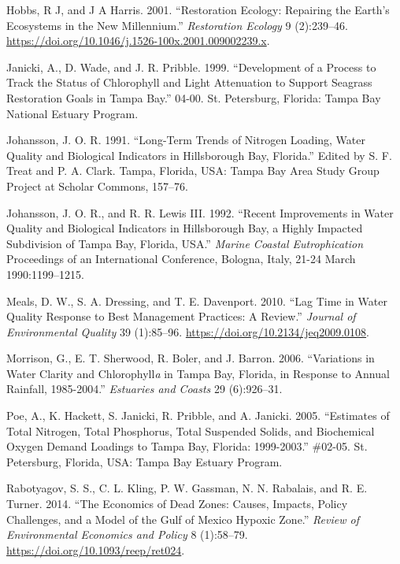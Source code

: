 \documentclass[]{article}
\begin{document}
\leavevmode\hypertarget{ref-Hobbs01}{}%
Hobbs, R J, and J A Harris. 2001. ``Restoration Ecology: Repairing the
Earth's Ecosystems in the New Millennium.'' \emph{Restoration Ecology} 9
(2):239--46. \url{https://doi.org/10.1046/j.1526-100x.2001.009002239.x}.

\leavevmode\hypertarget{ref-Janicki99}{}%
Janicki, A., D. Wade, and J. R. Pribble. 1999. ``Development of a
Process to Track the Status of Chlorophyll and Light Attenuation to
Support Seagrass Restoration Goals in Tampa Bay.'' 04-00. St.
Petersburg, Florida: Tampa Bay National Estuary Program.

\leavevmode\hypertarget{ref-Johansson91}{}%
Johansson, J. O. R. 1991. ``Long-Term Trends of Nitrogen Loading, Water
Quality and Biological Indicators in Hillsborough Bay, Florida.'' Edited
by S. F. Treat and P. A. Clark. Tampa, Florida, USA: Tampa Bay Area
Study Group Project at Scholar Commons, 157--76.

\leavevmode\hypertarget{ref-Johansson92}{}%
Johansson, J. O. R., and R. R. Lewis III. 1992. ``Recent Improvements in
Water Quality and Biological Indicators in Hillsborough Bay, a Highly
Impacted Subdivision of Tampa Bay, Florida, USA.'' \emph{Marine Coastal
Eutrophication} Proceedings of an International Conference, Bologna,
Italy, 21-24 March 1990:1199--1215.

\leavevmode\hypertarget{ref-Meals10}{}%
Meals, D. W., S. A. Dressing, and T. E. Davenport. 2010. ``Lag Time in
Water Quality Response to Best Management Practices: A Review.''
\emph{Journal of Environmental Quality} 39 (1):85--96.
\url{https://doi.org/10.2134/jeq2009.0108}.

\leavevmode\hypertarget{ref-Morrison06}{}%
Morrison, G., E. T. Sherwood, R. Boler, and J. Barron. 2006.
``Variations in Water Clarity and Chlorophyll\emph{a} in Tampa Bay,
Florida, in Response to Annual Rainfall, 1985-2004.'' \emph{Estuaries
and Coasts} 29 (6):926--31.

\leavevmode\hypertarget{ref-Poe05}{}%
Poe, A., K. Hackett, S. Janicki, R. Pribble, and A. Janicki. 2005.
``Estimates of Total Nitrogen, Total Phosphorus, Total Suspended Solids,
and Biochemical Oxygen Demand Loadings to Tampa Bay, Florida:
1999-2003.'' \#02-05. St. Petersburg, Florida, USA: Tampa Bay Estuary
Program.

\leavevmode\hypertarget{ref-Rabotyagov14}{}%
Rabotyagov, S. S., C. L. Kling, P. W. Gassman, N. N. Rabalais, and R. E.
Turner. 2014. ``The Economics of Dead Zones: Causes, Impacts, Policy
Challenges, and a Model of the Gulf of Mexico Hypoxic Zone.''
\emph{Review of Environmental Economics and Policy} 8 (1):58--79.
\url{https://doi.org/10.1093/reep/ret024}.
\end{document}
